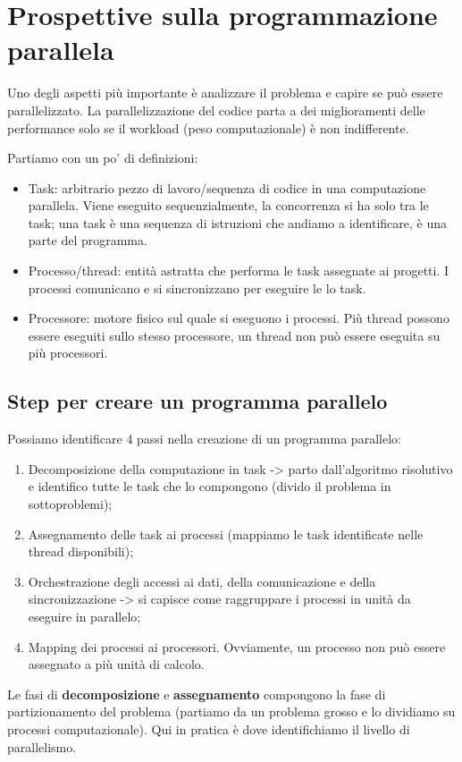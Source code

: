 \section{Prospettive sulla programmazione parallela}
Uno degli aspetti più importante è analizzare il problema e capire se può essere parallelizzato. La parallelizzazione del codice parta a dei miglioramenti delle performance solo se il workload (peso computazionale) è non indifferente.


Partiamo con un po' di definizioni:
\begin{itemize}
    \item Task: arbitrario pezzo di lavoro/sequenza di codice in una computazione parallela. Viene eseguito sequenzialmente, la concorrenza si ha solo tra le task;
    una task è una sequenza di istruzioni che andiamo a identificare, è una parte del programma.
    \item Processo/thread: entità astratta che performa le task assegnate ai progetti. I processi comunicano e si sincronizzano per eseguire le lo task.
    \item Processore: motore fisico sul quale si eseguono i processi. Più thread possono essere eseguiti sullo stesso processore, un thread non può essere eseguita su più processori.
\end{itemize}

\subsection{Step per creare un programma parallelo}
Possiamo identificare 4 passi nella creazione di un programma parallelo:
\begin{enumerate}
    \item Decomposizione della computazione in task -> parto dall'algoritmo risolutivo e identifico tutte le task che lo compongono (divido il problema in sottoproblemi);
    \item Assegnamento delle task ai processi (mappiamo le task identificate nelle thread disponibili); 
    \item Orchestrazione degli accessi ai dati, della comunicazione e della sincronizzazione -> si capisce come raggruppare i processi in unità da eseguire in parallelo;
    \item Mapping dei processi ai processori. Ovviamente, un processo non può essere assegnato a più unità di calcolo.
\end{enumerate}

Le fasi di \textbf{decomposizione} e \textbf{assegnamento} compongono la fase di partizionamento del problema (partiamo da un problema grosso e lo dividiamo su processi computazionale). Qui in pratica è dove identifichiamo il livello di parallelismo.

